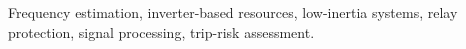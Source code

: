\begin{IEEEkeywords}
Frequency estimation, inverter-based resources, low-inertia systems, relay
protection, signal processing, trip-risk assessment.
\end{IEEEkeywords}
